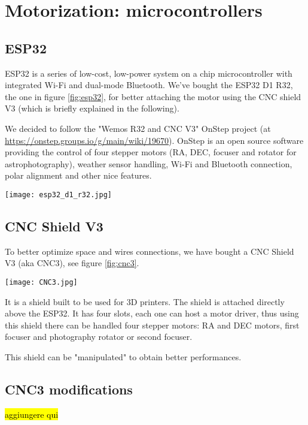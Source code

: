 \section{Motorization: microcontrollers}

\subsection{ESP32}
ESP32 is a series of low-cost, low-power system on a chip microcontroller with integrated Wi-Fi and dual-mode Bluetooth.
We've bought the ESP32 D1 R32, the one in figure \ref{fig:esp32}, for better attaching the motor using the CNC shield V3 (which is briefly explained in the following).

We decided to follow the "Wemos R32 and CNC V3" OnStep project (at \url{https://onstep.groups.io/g/main/wiki/19670}).
OnStep is an open source software providing the control of four stepper motors (RA, DEC, focuser and rotator for astrophotography), weather sensor handling, Wi-Fi and Bluetooth connection, polar alignment and other nice features.

\begin{minipage}
    {.4\textwidth}
    \centering
    \texttt{[image: esp32\_d1\_r32.jpg]}
    \label{fig:esp32}
\end{minipage}

\subsection{CNC Shield V3}
To better optimize space and wires connections, we have bought a CNC Shield V3 (aka CNC3), see figure \ref{fig:cnc3}.
\begin{minipage}
    {0.5\textwidth}
    \centering
    \texttt{[image: CNC3.jpg]}
    \label{fig:cnc3}
\end{minipage}
It is a shield built to be used for 3D printers.
The shield is attached directly above the ESP32.
It has four slots, each one can host a motor driver, thus using this shield there can be handled four stepper motors: RA and DEC motors, first focuser and photography rotator or second focuser.

This shield can be "manipulated" to obtain better performances.

\subsection{CNC3 modifications}
\hl{aggiungere qui}

